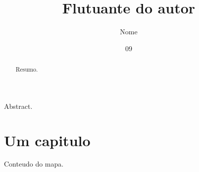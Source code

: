 \documentclass[dsc]{ufrj}
\title{Flutuante do autor}
\author{Nome}{Sobrenome}
\date{09}{2026}
\begin{document}
  \maketitle
  \frontmatter
  \begin{abstract}Resumo.\end{abstract}
  \begin{foreignabstract}Abstract.\end{foreignabstract}
  \listofmapas
  \tableofcontents
  \mainmatter
  \chapter{Um capitulo}
  \begin{mapa}
    \caption{Um mapa de teste}
    \centering Conteudo do mapa.
  \end{mapa}
\end{document}
